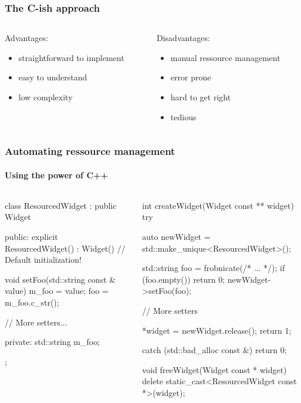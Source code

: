 \documentclass{beamer}
\def\titleinframe#1{{\usebeamercolor[fg]{structure} #1}}
\begin{document}
\begin{frame}[fragile]
\frametitle{The C-ish approach}
\begin{columns}[T]
\begin{column}{0.45\textwidth}
	\titleinframe{Advantages:}
	\begin{itemize}
	\item straightforward to implement
	\item easy to understand
	\item low complexity
	\end{itemize}
\end{column}
\pause
\begin{column}{0.45\textwidth}
	\titleinframe{Disadvantages:}
	\begin{itemize}
	\item manual ressource management
	\item error prone
	\item hard to get right
	\item tedious
	\end{itemize}
\end{column}
\end{columns}
\end{frame}


\begin{frame}[fragile]
\frametitle{Automating ressource management}
\framesubtitle{Using the power of C++}
\begin{columns}
\begin{column}{0.45\textwidth}
\pause
\begin{TinyC++}
class ResourcedWidget : public Widget
{
public:
	explicit ResourcedWidget()
        : Widget()	// Default initialization!
	{}

	void setFoo(std::string const & value)
	{
		m_foo = value;
		foo = m_foo.c_str();
	}

	// More setters...
	
private:
	std::string m_foo;
};
\end{TinyC++}
\end{column}
\pause
\begin{column}{0.45\textwidth}
\begin{TinyC++}
int createWidget(Widget const ** widget)
try
{
	auto newWidget = std::make_unique<ResourcedWidget>();
    
	std::string	foo = frobnicate(/* ... */);
	if (foo.empty())
	{
		return 0;
	}
	newWidget->setFoo(foo);

	// More setters
    
	*widget = newWidget.release();
	return 1;
}
catch (std::bad_alloc const &)
{
	return 0;
}
\end{TinyC++}
\pause
\begin{TinyC++}
void freeWidget(Widget const * widget)
{
	delete static_cast<ResourcedWidget const *>(widget);
}
\end{TinyC++}
\end{column}
\end{columns}
\end{frame}
\end{document}
